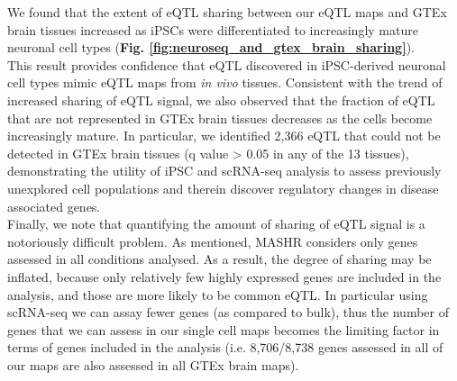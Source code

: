 We found that the extent of eQTL sharing between our eQTL maps and GTEx brain tissues increased as iPSCs were differentiated to increasingly mature neuronal cell types (\textbf{Fig. \ref{fig:neuroseq_and_gtex_brain_sharing}}). \\

This result provides confidence that eQTL discovered in iPSC-derived neuronal cell types mimic eQTL maps from \textit{in vivo} tissues. 
Consistent with the trend of increased sharing of eQTL signal, we also observed that the fraction of eQTL that are not represented in GTEx brain tissues decreases as the cells become increasingly mature. 
In particular, we identified 2,366 eQTL that could not be detected in GTEx brain tissues (q value > 0.05 in any of the 13 tissues), demonstrating the utility of iPSC and scRNA-seq analysis to assess previously unexplored cell populations and therein discover regulatory changes in disease associated genes. \\

Finally, we note that quantifying the amount of sharing of eQTL signal is a notoriously difficult problem.
As mentioned, MASHR considers only genes assessed in all conditions analysed. 
As a result, the degree of sharing may be inflated, because only relatively few highly expressed genes are included in the analysis, and those are more likely to be common eQTL. 
In particular using scRNA-seq we can assay fewer genes (as compared to bulk), thus the number of genes that we can assess in our single cell maps becomes the limiting factor in terms of genes included in the analysis (i.e. 8,706/8,738 genes assessed in all of our maps are also assessed in all GTEx brain maps).\\


